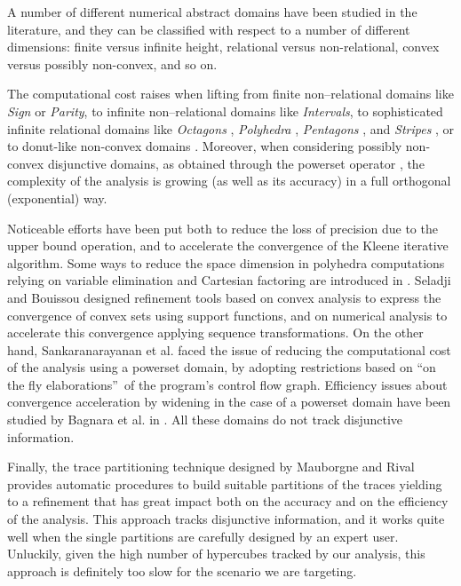 A number of different numerical abstract domains have been studied in the literature, and they can be classified with respect to a number of different dimensions: finite versus infinite height, relational versus non-relational, convex versus possibly non-convex, and so on. 

The computational cost raises when lifting from finite non–relational domains like \textit{Sign} or \textit{Parity}, to 
infinite non–relational domains like \textit{Intervals}, to sophisticated infinite relational domains like \textit{Octagons} \cite{MIN06}, \textit{Polyhedra} \cite{CH78}, \textit{Pentagons} \cite{LF08}, and \textit{Stripes} \cite{F08}, or to donut-like non-convex domains \cite{G12}. Moreover, when considering possibly non-convex disjunctive domains, as obtained through the powerset operator \cite{FR99}, the complexity of the analysis is growing (as well as its accuracy) in a full orthogonal (exponential) way.

Noticeable efforts have been put both to reduce the loss of precision due to the upper bound operation, and to accelerate the convergence of the Kleene iterative algorithm. Some ways to reduce the space dimension in polyhedra computations relying on variable elimination and Cartesian factoring are introduced in \cite{HMG06}.  
Seladji and Bouissou \cite{SB13} designed refinement tools based on convex analysis to express the convergence of convex sets using support functions, and on numerical analysis to accelerate this convergence applying sequence transformations. 
On the other hand, Sankaranarayanan et al. \cite{SISG06} faced the issue of reducing the computational cost of the analysis using a powerset domain, by adopting restrictions based on \textquotedblleft on the fly elaborations\textquotedblright\ of the program's control flow graph. Efficiency issues about convergence acceleration by widening in the case of a powerset domain have been studied by Bagnara et al. in \cite{BHZ07}. All these domains do not track disjunctive information.

Finally, the trace partitioning technique designed by Mauborgne and Rival \cite{MR05} provides automatic procedures to build suitable partitions of the traces yielding to a refinement that has great impact both on the accuracy and on the efficiency of the analysis. This approach tracks disjunctive information, and it works quite well when the single partitions are carefully designed by an expert user. Unluckily, given the high number of hypercubes tracked by our analysis, this approach is definitely too slow for the scenario we are targeting.

